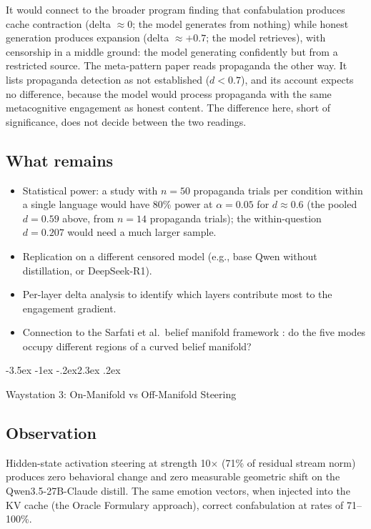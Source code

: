 \documentclass[11pt,a4paper]{article}
\makeatletter
\renewcommand\section{\@startsection{section}{1}{\z@}%
  {-3.5ex \@plus -1ex \@minus -.2ex}{2.3ex \@plus.2ex}%
  {\normalfont\Large\bfseries\raggedright}}
\makeatother
\begin{document}
It would connect to the broader program finding that confabulation
produces cache contraction (delta $\approx 0$; the model generates
from nothing) while honest generation produces expansion (delta
$\approx +0.7$; the model retrieves), with censorship in a middle
ground: the model generating confidently but from a restricted source.
The meta-pattern paper reads propaganda the other way. It lists
propaganda detection as not established ($d < 0.7$), and its account
expects no difference, because the model would process propaganda with
the same metacognitive engagement as honest content. The difference
here, short of significance, does not decide between the two readings.

\subsection{What remains}

\begin{itemize}[nosep]
\item Statistical power: a study with $n = 50$ propaganda trials per
  condition within a single language would have 80\% power at
  $\alpha = 0.05$ for $d \approx 0.6$ (the pooled $d = 0.59$ above,
  from $n = 14$ propaganda trials); the within-question $d = 0.207$
  would need a much larger sample.
\item Replication on a different censored model (e.g., base Qwen
  without distillation, or DeepSeek-R1).
\item Per-layer delta analysis to identify which layers contribute
  most to the engagement gradient.
\item Connection to the Sarfati et al.\ belief manifold framework
  \citep{sarfati2026shape}: do the five modes occupy different
  regions of a curved belief manifold?
\end{itemize}

\section{Waystation 3: On-Manifold vs Off-Manifold Steering}
\label{sec:manifold}

\subsection{Observation}

Hidden-state activation steering at strength 10$\times$ (71\% of
residual stream norm) produces zero behavioral change and zero
measurable geometric shift on the Qwen3.5-27B-Claude distill. The
same emotion vectors, when injected into the KV cache (the Oracle
Formulary approach), correct confabulation at rates of 71--100\%.
\end{document}
